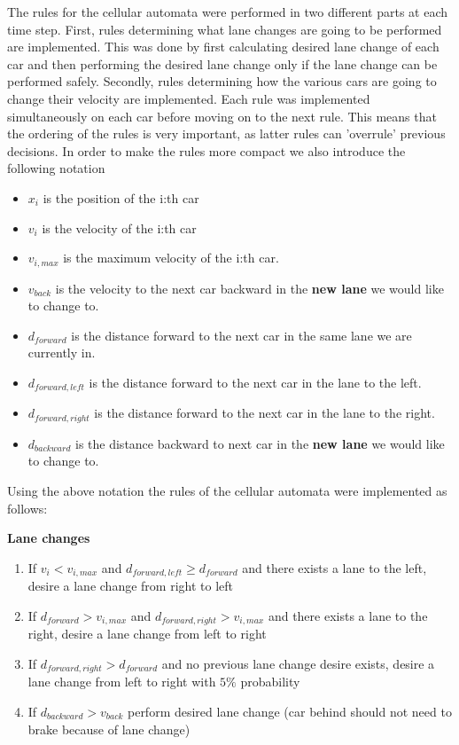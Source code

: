 \documentclass[a4paper,12pt]{article}
\begin{document}
The rules for the cellular automata were performed in two different parts at each time step.
First, rules determining what lane changes are going to be performed are implemented. This was done by first calculating desired lane change of each car and then
performing the desired lane change only if the lane change can be performed safely.
Secondly, rules determining how the various cars are going to change their velocity are implemented.
Each rule was implemented simultaneously on each car before moving on to the next rule. This means that the ordering of the rules is very important, as latter rules can 'overrule' previous decisions.
In order to make the rules more compact we also introduce the following notation

\begin{itemize}
    \item $x_i$ is the position of the i:th car
    \item $v_i$ is the velocity of the i:th car
    \item $v_{i, max}$ is the maximum velocity of the i:th car.
    \item $v_{back}$ is the velocity to the next car backward in the \textbf{new lane} we would like to change to.
    \item $d_{forward}$ is the distance forward to the next car in the same lane we are currently in.
    \item $d_{forward, left}$ is the distance forward to the next car in the lane to the left.
    \item $d_{forward, right}$ is the distance forward to the next car in the lane to the right.
    \item $d_{backward}$ is the distance backward to next car in the \textbf{new lane} we would like to change to.
\end{itemize}

Using the above notation the rules of the cellular automata were implemented as follows:

\vspace{5pt}
\textbf{Lane changes}
\begin{enumerate}
    \item If $v_i<v_{i,max}$ and $d_{forward, left}\geq d_{forward}$ and there exists a lane to the left, desire a lane change from right to left
    \item If $d_{forward} > v_{i, max}$ and $d_{forward, right} > v_{i, max}$ and there exists a lane to the right, desire a lane change from left to right
    \item If $d_{forward, right} > d_{forward}$ and no previous lane change desire exists, desire a lane change from left to right with $5\%$ probability
    \item If $d_{backward} > v_{back}$ perform desired lane change (car behind should not need to brake because of lane change)
\end{enumerate}
\end{document}
